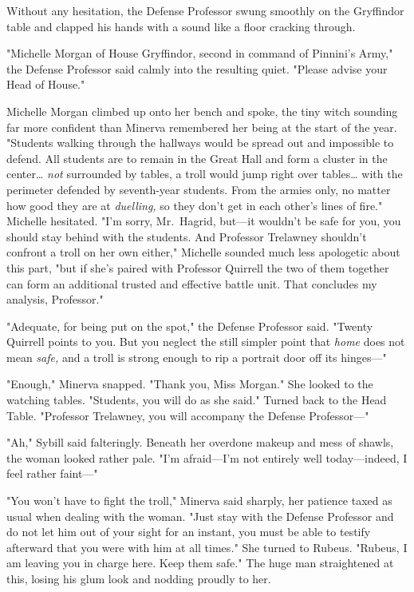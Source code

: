Without any hesitation, the Defense Professor swung smoothly on the Gryffindor table and clapped his hands with a sound like a floor cracking through.

"Michelle Morgan of House Gryffindor, second in command of Pinnini's Army," the Defense Professor said calmly into the resulting quiet. "Please advise your Head of House."

Michelle Morgan climbed up onto her bench and spoke, the tiny witch sounding far more confident than Minerva remembered her being at the start of the year. "Students walking through the hallways would be spread out and impossible to defend. All students are to remain in the Great Hall and form a cluster in the center{\ldots} \emph{not} surrounded by tables, a troll would jump right over tables{\ldots} with the perimeter defended by seventh-year students. From the armies only, no matter how good they are at \emph{duelling,} so they don't get in each other's lines of fire." Michelle hesitated. "I'm sorry, Mr.~Hagrid, but---it wouldn't be safe for you, you should stay behind with the students. And Professor Trelawney shouldn't confront a troll on her own either," Michelle sounded much less apologetic about this part, "but if she's paired with Professor Quirrell the two of them together can form an additional trusted and effective battle unit. That concludes my analysis, Professor."

"Adequate, for being put on the spot," the Defense Professor said. "Twenty Quirrell points to you. But you neglect the still simpler point that \emph{home} does not mean \emph{safe,} and a troll is strong enough to rip a portrait door off its hinges---"

"Enough," Minerva snapped. "Thank you, Miss Morgan." She looked to the watching tables. "Students, you will do as she said." Turned back to the Head Table. "Professor Trelawney, you will accompany the Defense Professor---"

"Ah," Sybill said falteringly. Beneath her overdone makeup and mess of shawls, the woman looked rather pale. "I'm afraid---I'm not entirely well today---indeed, I feel rather faint---"

"You won't have to fight the troll," Minerva said sharply, her patience taxed as usual when dealing with the woman. "Just stay with the Defense Professor and do not let him out of your sight for an instant, you must be able to testify afterward that you were with him at all times\emph{.}" She turned to Rubeus. "Rubeus, I am leaving you in charge here. Keep them safe." The huge man straightened at this, losing his glum look and nodding proudly to her.


